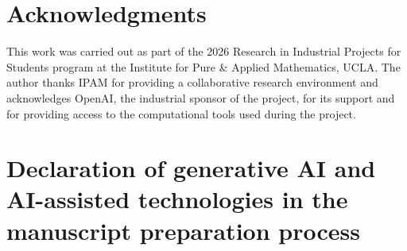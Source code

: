 \documentclass[11pt]{amsart}
\theoremstyle{definition}
\theoremstyle{remark}
\begin{document}
\section*{Acknowledgments}

This work was carried out as part of the 2026 Research in Industrial Projects
for Students program at the Institute for Pure \& Applied Mathematics,
UCLA.  The author thanks IPAM for providing a collaborative research
environment and acknowledges OpenAI, the industrial sponsor of the project,
for its support and for providing access to the computational tools used
during the project.

\section*{Declaration of generative AI and AI-assisted technologies in the
manuscript preparation process}
\end{document}
